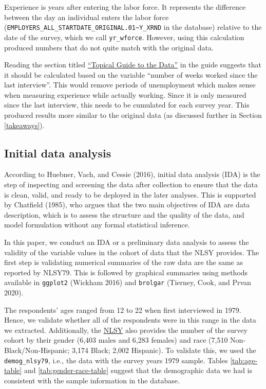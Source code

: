 \documentclass[12pt]{article}
\begin{document}
Experience is years after entering the labor force. It represents the difference between the day an individual enters the labor force (\texttt{EMPLOYERS\_ALL\_STARTDATE\_ORIGINAL.01\textasciitilde{}Y\_XRND} in the database) relative to the date of the survey, which we call \texttt{yr\_wforce}. However, using this calculation produced numbers that do not quite match with the original data.

Reading the section titled \href{https://www.nlsinfo.org/content/cohorts/nlsy79/topical-guide/employment/work-experience}{``Topical Guide to the Data''} in the guide suggests that it should be calculated based on the variable ``number of weeks worked since the last interview''. This would remove periods of unemployment which makes sense when measuring experience while actually working. Since it is only measured since the last interview, this needs to be cumulated for each survey year. This produced results more similar to the original data (as discussed further in Section \ref{takeaways}).

\hypertarget{ida}{%
\subsection{Initial data analysis}\label{ida}}

According to Huebner, Vach, and Cessie (2016), initial data analysis (IDA) is the step of inspecting and screening the data after collection to ensure that the data is clean, valid, and ready to be deployed in the later analyses. This is supported by Chatfield (1985), who argues that the two main objectives of IDA are data description, which is to assess the structure and the quality of the data, and model formulation without any formal statistical inference.

In this paper, we conduct an IDA or a preliminary data analysis to assess the validity of the variable values in the cohort of data that the NLSY provides. The first step is validating numerical summaries of the raw data are the same as reported by NLSY79. This is followed by graphical summaries using methods available in \texttt{ggplot2} (Wickham 2016) and \texttt{brolgar} (Tierney, Cook, and Prvan 2020).

The respondents' ages ranged from 12 to 22 when first interviewed in 1979. Hence, we validate whether all of the respondents were in this range in the data we extracted. Additionally, the \href{https://www.nlsinfo.org/content/cohorts/nlsy79/intro-to-the-sample/nlsy79-sample-introduction}{NLSY} also provides the number of the survey cohort by their gender (6,403 males and 6,283 females) and race (7,510 Non-Black/Non-Hispanic; 3,174 Black; 2,002 Hispanic). To validate this, we used the \texttt{demog\_nlsy79}, i.e., the data with the survey years 1979 sample. Tables \ref{tab:age-table} and \ref{tab:gender-race-table} suggest that the demographic data we had is consistent with the sample information in the database.
\end{document}
